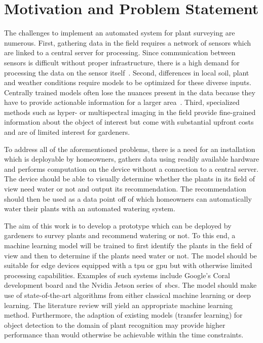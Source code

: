 \documentclass[draft,final]{vutinfth} %
\begin{document}
\section{Motivation and Problem Statement}
\label{sec:motivation}

The challenges to implement an automated system for plant surveying
are numerous. First, gathering data in the field requires a network of
sensors which are linked to a central server for processing. Since
communication between sensors is difficult without proper
infrastructure, there is a high demand for processing the data on the
sensor itself~\cite{mcenroe2022}. Second, differences in local soil,
plant and weather conditions require models to be optimized for these
diverse inputs. Centrally trained models often lose the nuances
present in the data because they have to provide actionable
information for a larger area~\cite{awad2019}. Third, specialized
methods such as hyper- or multispectral imaging in the field provide
fine-grained information about the object of interest but come with
substantial upfront costs and are of limited interest for gardeners.

To address all of the aforementioned problems, there is a need for an
installation which is deployable by homeowners, gathers data using
readily available hardware and performs computation on the device
without a connection to a central server. The device should be able to
visually determine whether the plants in its field of view need water
or not and output its recommendation. The recommendation should then
be used as a data point off of which homeowners can automatically
water their plants with an automated watering system.

The aim of this work is to develop a prototype which can be deployed
by gardeners to survey plants and recommend watering or not. To this
end, a machine learning model will be trained to first identify the
plants in the field of view and then to determine if the plants need
water or not. The model should be suitable for edge devices equipped
with a \gls{tpu} or \gls{gpu} but with otherwise limited processing
capabilities. Examples of such systems include Google's Coral
development board and the Nvidia Jetson series of~\glspl{sbc}. The
model should make use of state-of-the-art algorithms from either
classical machine learning or deep learning. The literature review
will yield an appropriate machine learning method. Furthermore, the
adaption of existing models (transfer learning) for object detection
to the domain of plant recognition may provide higher performance than
would otherwise be achievable within the time constraints.
\end{document}
